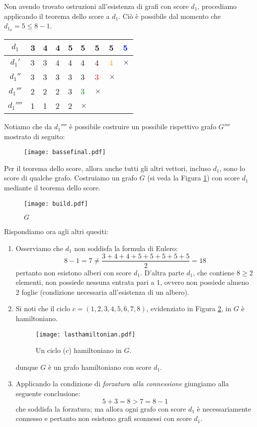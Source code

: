 Non avendo trovato ostruzioni all'esistenza di
grafi con score $d_1$, procediamo applicando il
teorema dello score a $d_1$. Ciò è possibile
dal momento che $d_{1_8} = 5 \leq 8 - 1$.

\begin{center}
    \begin{tabular}{c|llllllll}
        $d_1$   & 3 & 4 & 4 & 5 & 5 & 5 & 5 & \textcolor{blue}{5}\\
        \hline
        $d_1'$  & 3 & 3 & 4 & 4 & 4 & 4 & \textcolor{orange}{4} & $\times$\\
        \hline
        $d_1''$ & 3 & 3 & 3 & 3 & 3 & \textcolor{red}{3} & $\times$ &\\
        \hline
        $d_1'''$ & 2 & 2 & 2 & 3 & \textcolor{green}{3} & $\times$ &&\\
        \hline
        $d_1''''$ & 1 & 1 & 2 & 2 & $\times$ &&&
    \end{tabular}
\end{center}
Notiamo che da $d_1''''$ è possibile costruire un possibile rispettivo
grafo $G''''$ mostrato di seguito:
\begin{figure}[H]
\centering
\texttt{[image: bassefinal.pdf]}
\end{figure}

\noindent Per il teorema dello score, allora anche tutti gli altri vettori,
incluso $d_1$, sono lo score di qualche grafo. Costruiamo un grafo
$G$ (si veda la Figura \ref{final}) con score $d_1$ mediante il teorema dello score.
\begin{figure}[H]
\centering
\texttt{[image: build.pdf]}
\caption{$G$}
\label{final}
\end{figure}

\noindent Rispondiamo ora agli altri quesiti:
\begin{enumerate}
    \item Osserviamo che $d_1$ non soddisfa la formula di Eulero:
    \[ 8-1 = 7 \not= \frac{3+4+4+5+5+5+5+5}{2} = 18 \]
    pertanto non esistono alberi con score $d_1$. D'altra parte
    $d_1$, che contiene $8\geq2$ elementi, non possiede nessuna
    entrata pari a 1, ovvero non possiede almeno 2 foglie
    (condizione necessaria all'esistenza di un albero).
    \item Si noti che il ciclo $c=(1,2,3,4,5,6,7,8)$, evidenziato in
    Figura \ref{lasthamiltonian}, in $G$ è hamiltoniano.
    \begin{figure}[H]
    \centering
    \texttt{[image: lasthamiltonian.pdf]}
    \caption{Un ciclo ($c$) hamiltoniano in $G$.}
    \label{lasthamiltonian}
    \end{figure}
    dunque $G$ è un grafo hamiltoniano con score $d_1$.

    \item Applicando la condizione di \textit{forzatura alla connessione}
    giungiamo alla seguente conclusione:
    \[ 5+3 = 8 > 7 = 8-1 \]
    che soddisfa la forzatura; ma allora ogni grafo con score
    $d_1$ è necessariamente connesso e pertanto non esistono
    grafi sconnessi con score $d_1$.
\end{enumerate}